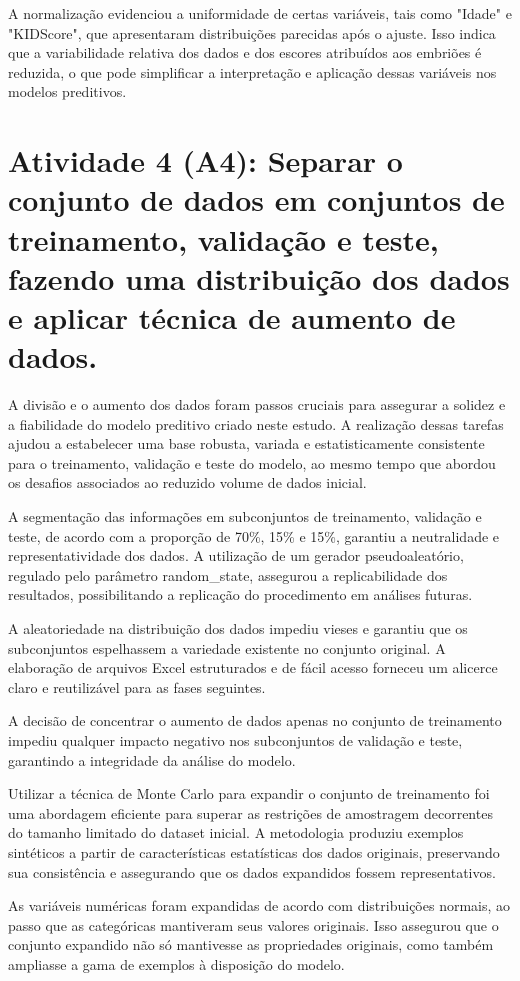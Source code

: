 A normalização evidenciou a uniformidade de certas variáveis, tais como "Idade" e "KIDScore", que apresentaram distribuições parecidas após o ajuste. Isso indica que a variabilidade relativa dos dados e dos escores atribuídos aos embriões é reduzida, o que pode simplificar a interpretação e aplicação dessas variáveis nos modelos preditivos.

\section{Atividade 4 (A4): Separar o conjunto de dados em conjuntos de treinamento, validação e teste, fazendo uma distribuição dos dados e aplicar técnica de aumento de dados.}

A divisão e o aumento dos dados foram passos cruciais para assegurar a solidez e a fiabilidade do modelo preditivo criado neste estudo. A realização dessas tarefas ajudou a estabelecer uma base robusta, variada e estatisticamente consistente para o treinamento, validação e teste do modelo, ao mesmo tempo que abordou os desafios associados ao reduzido volume de dados inicial.

A segmentação das informações em subconjuntos de treinamento, validação e teste, de acordo com a proporção de 70\%, 15\% e 15\%, garantiu a neutralidade e representatividade dos dados. A utilização de um gerador pseudoaleatório, regulado pelo parâmetro random_state, assegurou a replicabilidade dos resultados, possibilitando a replicação do procedimento em análises futuras.

A aleatoriedade na distribuição dos dados impediu vieses e garantiu que os subconjuntos espelhassem a variedade existente no conjunto original. A elaboração de arquivos Excel estruturados e de fácil acesso forneceu um alicerce claro e reutilizável para as fases seguintes.

A decisão de concentrar o aumento de dados apenas no conjunto de treinamento impediu qualquer impacto negativo nos subconjuntos de validação e teste, garantindo a integridade da análise do modelo.

Utilizar a técnica de Monte Carlo para expandir o conjunto de treinamento foi uma abordagem eficiente para superar as restrições de amostragem decorrentes do tamanho limitado do dataset inicial. A metodologia produziu exemplos sintéticos a partir de características estatísticas dos dados originais, preservando sua consistência e assegurando que os dados expandidos fossem representativos.

As variáveis numéricas foram expandidas de acordo com distribuições normais, ao passo que as categóricas mantiveram seus valores originais. Isso assegurou que o conjunto expandido não só mantivesse as propriedades originais, como também ampliasse a gama de exemplos à disposição do modelo.

